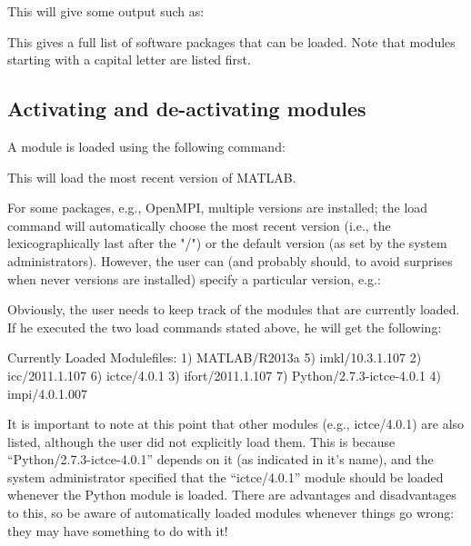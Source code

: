 This will give some output such as:


This gives a full list of software packages that can be loaded. Note that
modules starting with a capital letter are listed first.

\subsection{Activating and de-activating modules}

A module is loaded using the following command:

\begin{prompt}
\end{prompt}

This will load the most recent version of MATLAB.

For some packages, e.g., OpenMPI, multiple versions are installed; the load
command will automatically choose the most recent version (i.e., the
lexicographically last after the "/") or the default version (as set by the
system administrators). However, the user can (and probably should, to avoid
surprises when never versions are installed) specify a particular version,
e.g.:

\begin{prompt}
\end{prompt}

Obviously, the user needs to keep track of the modules that are currently
loaded. If he executed the two load commands stated above, he will get the
following:

\begin{prompt}
Currently Loaded Modulefiles:
  1) MATLAB/R2013a        5) imkl/10.3.1.107
  2) icc/2011.1.107       6) ictce/4.0.1
  3) ifort/2011.1.107     7) Python/2.7.3-ictce-4.0.1
  4) impi/4.0.1.007
\end{prompt}

It is important to note at this point that other modules (e.g., ictce/4.0.1)
are also listed, although the user did not explicitly load them. This is
because ``Python/2.7.3-ictce-4.0.1'' depends on it (as indicated in it's name),
and the system administrator specified that the ``ictce/4.0.1'' module should
be loaded whenever the Python module is loaded. There are advantages and
disadvantages to this, so be aware of automatically loaded modules whenever
things go wrong: they may have something to do with it!

